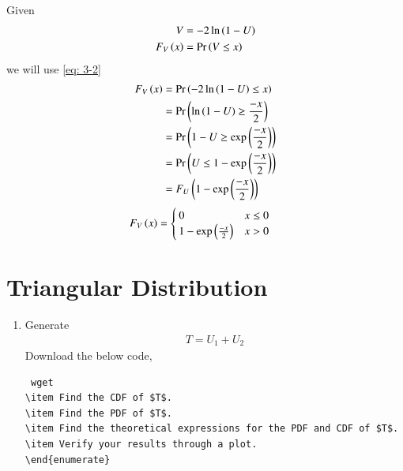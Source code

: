 \documentclass[journal,12pt,twocolumn]{IEEEtran}
\renewcommand\thesection{\arabic{section}}
\begin{document}
\begin{enumerate}[label=\thesection.\arabic*,ref=\thesection.\theenumi]
\solution Given 
\begin{align}
	V &= -2\ln\left(1-U\right)\\ \label{eq: 3-2}
	 F_V\left(x\right) &= \Pr\left(V\leq x\right)
\end{align}
 we will use \eqref{eq: 3-2}
 \begin{align}
	 F_V\left(x\right) &= \Pr\left(-2\ln\left(1-U\right) \leq x\right)\\
	             &= \Pr\left( \ln\left(1-U\right) \geq \frac{-x}{2}\right)\\
		         &= \Pr\left(  1-U \geq \exp\left(\frac{-x}{2}\right)\right)\\
		         &= \Pr\left( U \leq 1 - \exp\left(\frac{-x}{2}\right)\right)\\
                 &= F_U\left(1-\exp\left(\frac{-x}{2}\right)\right)
 \end{align}
 \begin{align}
	 F_V\left(x\right) &=
	           \begin{cases}
			                0  & x\leq 0 \\
		            1-\exp\left(\frac{-x}{2}\right) & x >0	   
               \end{cases}
 \end{align}		   
%
 \section{Triangular Distribution}
\begin{enumerate}[label=\thesection.\arabic*
,ref=\thesection.\theenumi]
%
\item Generate
	\begin{align}
		T = U_1+U_2
	\end{align}
\solution Download the below code,
 \begin{lstlisting}
 wget 
\item Find the CDF of $T$.
\item Find the PDF of $T$.
\item Find the theoretical expressions for the PDF and CDF of $T$.
\item Verify your results through a plot.
\end{enumerate}

\end{lstlisting}
\end{enumerate}
\end{enumerate}
\end{document}
